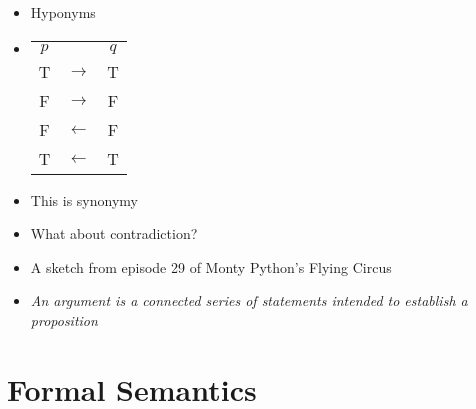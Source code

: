 \documentclass[headrule,footrule]{foils}
\begin{document}
\begin{itemize}
\item Hyponyms
  \begin{exe}
    \ex {}
    \ex {}
  \end{exe}
\end{itemize}
\begin{itemize}
\item 
  \begin{exe}
    \ex {}
    \ex {}
  \end{exe}
\begin{center}
  \begin{tabular}{|c|c|c|}
    \cline{1-3}
    $p$ &  & $q$   \\
    \cline{1-3}
    T & $\rightarrow$  & T  \\ 
    F & $\rightarrow$  & F \\ 
    F & $\leftarrow$  & F  \\ 
    T & $\leftarrow$  & T  \\ 
    \cline{1-3}
  \end{tabular}
\end{center}
\item This is synonymy
\item What about contradiction?
\end{itemize}



\begin{itemize}
\item A sketch from episode 29 of
  Monty Python's Flying Circus
\item \textit{An argument is a connected series of statements intended to establish a proposition}
\end{itemize}



\section{Formal Semantics}

\end{document}
